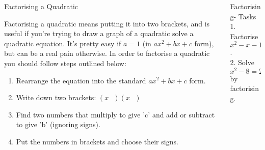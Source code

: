 \documentclass[final]{beamer}
\newlength{\onecolwid}
\newlength{\twocolwid}
\begin{document}
\begin{frame}[t]
\begin{columns}[t]
\begin{column}{\twocolwid}
\begin{columns}[t,totalwidth=\twocolwid]
\begin{column}{\onecolwid}
    
    \begin{block}{Factorising a Quadratic}
  
  Factorising a quadratic means putting it into two brackets, and is useful if you're trying to draw a graph of a quadratic solve a quadratic equation. It's pretty easy if $a=1$ (in $ax^2+bx+c$ form), but can be a real pain otherwise.
  \newline
  \newline
  In order to factorise a quadratic you should follow steps outlined below:
    
    \begin{enumerate}
  \item Rearrange the equation into the standard $ax^2+bx+c$ form.
  \item Write down two brackets: $(x\ \ \ )(x\ \ \ )$
    \item Find two numbers that multiply to give 'c' and add or subtract to give 'b' (ignoring signs).
  \item Put the numbers in brackets and choose their signs.
  \end{enumerate}
  
  \end{block}
  
    
    \end{column} %
  
  \begin{column}{\onecolwid}\vspace{-.6in} %
  
    
    \begin{block}{Factorising- Tasks}
  1. Factorise $x^2-x-12$.
  \[\]
  \[\]
  \[\]
  \[\]
  2. Solve $x^2-8=2x$ by factorising.
  
  \end{block}
  
    

\end{column}
\end{columns}
\end{column}
\end{columns}
\end{frame}
\end{document}
